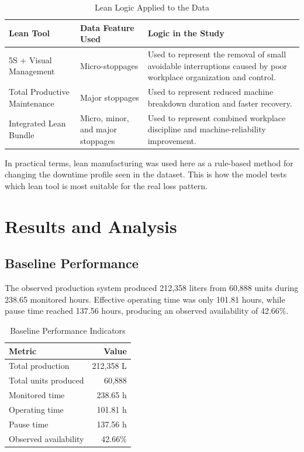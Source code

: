 \documentclass[12pt,a4paper]{article}
\begin{document}
\begin{table}[H]
\centering
\caption{Lean Logic Applied to the Data}
\begin{tabular}{p{3.3cm}p{3.8cm}p{7cm}}
\toprule
Lean Tool & Data Feature Used & Logic in the Study \\
\midrule
5S + Visual Management & Micro-stoppages & Used to represent the removal of small avoidable interruptions caused by poor workplace organization and control. \\
Total Productive Maintenance & Major stoppages & Used to represent reduced machine breakdown duration and faster recovery. \\
Integrated Lean Bundle & Micro, minor, and major stoppages & Used to represent combined workplace discipline and machine-reliability improvement. \\
\bottomrule
\end{tabular}
\end{table}

In practical terms, lean manufacturing was used here as a rule-based method for changing the downtime profile seen in the dataset. This is how the model tests which lean tool is most suitable for the real loss pattern.

\section{Results and Analysis}
\subsection{Baseline Performance}
The observed production system produced 212,358 liters from 60,888 units during 238.65 monitored hours. Effective operating time was only 101.81 hours, while pause time reached 137.56 hours, producing an observed availability of 42.66\%.

\begin{table}[H]
\centering
\caption{Baseline Performance Indicators}
\begin{tabular}{lr}
\toprule
Metric & Value \\
\midrule
Total production & 212,358 L \\
Total units produced & 60,888 \\
Monitored time & 238.65 h \\
Operating time & 101.81 h \\
Pause time & 137.56 h \\
Observed availability & 42.66\% \\
\bottomrule
\end{tabular}
\end{table}
\end{document}
